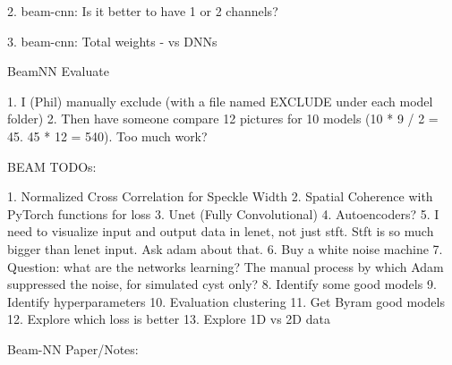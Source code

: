 \documentclass{article}
\begin{document}
2. beam-cnn: Is it better to have 1 or 2 channels?

3. beam-cnn: Total weights - vs DNNs

BeamNN Evaluate

1. I (Phil) manually exclude (with a file named EXCLUDE under each model folder)
2. Then have someone compare 12 pictures for 10 models (10 * 9 / 2 = 45. 45 * 12 = 540). Too much work?




BEAM TODOs:

1. Normalized Cross Correlation for Speckle Width
2. Spatial Coherence with PyTorch functions for loss
3. Unet (Fully Convolutional)
4. Autoencoders?
5. I need to visualize input and output data in lenet, not just stft. Stft is so much bigger than lenet input. Ask adam about that.
6. Buy a white noise machine
7. Question: what are the networks learning? The manual process by which Adam suppressed the noise, for simulated cyst only?
8. Identify some good models
9. Identify hyperparameters
10. Evaluation clustering
11. Get Byram good models
12. Explore which loss is better
13. Explore 1D vs 2D data


Beam-NN Paper/Notes:
\end{document}
